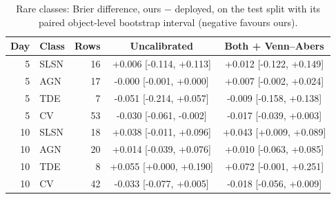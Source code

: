 \begin{table}[!htbp]
\centering
\caption{Rare classes: Brier difference, ours $-$ deployed, on the test split with its paired object-level bootstrap interval (negative favours ours).}
\label{tab:closurerare}
\scriptsize
\begin{tabular}{rlrcc}
\toprule
Day & Class & Rows & Uncalibrated & Both + Venn--Abers \\
\midrule
5 & SLSN & 16 & +0.006 [-0.114, +0.113] & +0.012 [-0.122, +0.149] \\
5 & AGN & 17 & -0.000 [-0.001, +0.000] & +0.007 [-0.002, +0.024] \\
5 & TDE & 7 & -0.051 [-0.214, +0.057] & -0.009 [-0.158, +0.138] \\
5 & CV & 53 & -0.030 [-0.061, -0.002] & -0.017 [-0.039, +0.003] \\
\midrule
10 & SLSN & 18 & +0.038 [-0.011, +0.096] & +0.043 [+0.009, +0.089] \\
10 & AGN & 20 & +0.014 [-0.039, +0.076] & +0.010 [-0.063, +0.085] \\
10 & TDE & 8 & +0.055 [+0.000, +0.190] & +0.072 [-0.001, +0.251] \\
10 & CV & 42 & -0.033 [-0.077, +0.005] & -0.018 [-0.056, +0.009] \\
\bottomrule
\end{tabular}
\end{table}
